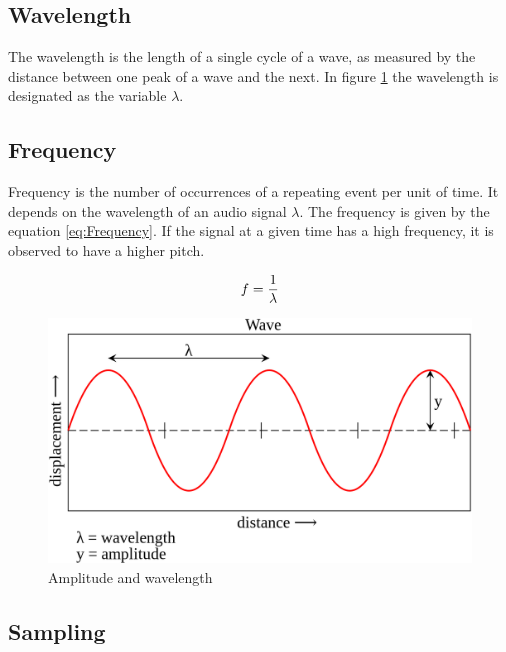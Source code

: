 \subsection{Wavelength}
\label{sub:Wavelength}

The wavelength is the length of a single cycle of a wave, as measured by the distance between one peak of a wave and the next. In figure \ref{fig:Amplitude-Wavelenght} the wavelength is designated as the variable $\lambda$.

\subsection{Frequency}
\label{sub:Frequency}

Frequency is the number of occurrences of a repeating event per unit of time. It depends on the wavelength of an audio signal $\lambda$. The frequency is given by the equation \ref{eq:Frequency}. If the signal at a given time has a high frequency, it is observed to have a higher pitch.

\begin{equation}
    \centering
    f = \frac{1}{\lambda}
    \label{eq:Frequency}
\end{equation}

\begin{figure}[htbp]
	\centering
	\includegraphics[scale=0.25]{baa-documentation/img/Amplitude.png}
	\caption[Amplitude and wavelength illustrated]{Amplitude and wavelength \footnotemark}
	\label{fig:Amplitude-Wavelenght}
\end{figure}

\subsection{Sampling}
\label{sub:Sampling}

